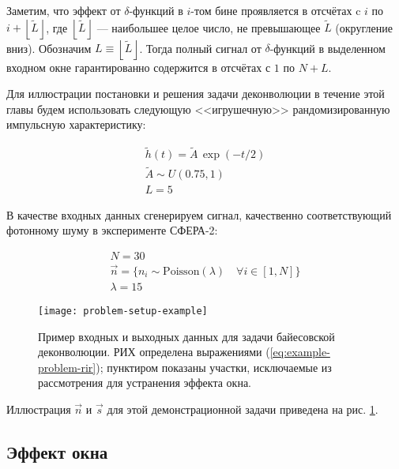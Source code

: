 Заметим, что эффект от $\delta$-функций в $i$-том бине проявляется в отсчётах c $i$ по $i + \left \lfloor{\tilde{L}}\right \rfloor$, где $\left \lfloor{\tilde{L}}\right \rfloor$ --- наибольшее целое число, не превышающее $\tilde{L}$ (округление вниз). Обозначим $L \equiv \left \lfloor{\tilde{L}}\right \rfloor$. Тогда полный сигнал от $\delta$-функций в выделенном входном окне гарантированно содержится в отсчётах с $1$ по $N + L$.

Для иллюстрации постановки и решения задачи деконволюции в течение этой главы будем использовать следующую <<игрушечную>> рандомизированную импульсную характеристику: 

\begin{equation}
	\label{eq:example-problem-rir}
	\begin{gathered}
		\tilde{h}(t) = \tilde{A} \, \exp(-t/2) \\
		\tilde{A} \sim U(0.75, 1) \\
		L = 5
	\end{gathered}
\end{equation}

В качестве входных данных сгенерируем сигнал, качественно соответствующий фотонному шуму в эксперименте СФЕРА-2: 

\begin{equation}
	\label{eq:example-problem-input}
	\begin{gathered}
		N = 30 \\
		\vec{n} = \{n_i \sim \mathrm{Poisson}(\lambda) \quad \forall i \in [1, N]\} \\
		\lambda = 15
	\end{gathered}
\end{equation} 

\begin{figure}
	\centering
	\texttt{[image: problem-setup-example]}
	\caption{Пример входных и выходных данных для задачи байесовской деконволюции. РИХ определена выражениями (\ref{eq:example-problem-rir}); пунктиром показаны участки, исключаемые из рассмотрения для устранения эффекта окна.}
	\label{pic:problem-setup}
\end{figure}

Иллюстрация $\vec{n}$ и $\vec{s}$ для этой демонстрационной задачи приведена на рис. \ref{pic:problem-setup}.

\subsection{Эффект окна} \label{sec:edge-effects}

